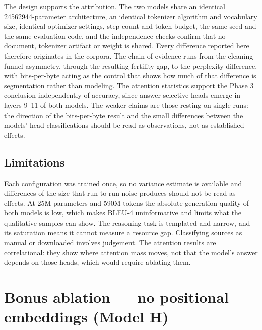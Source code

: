 \documentclass[10pt,a4paper]{article}
\begin{document}
The design supports the attribution. The two models share an identical \num{24562944}-parameter
architecture, an identical tokenizer algorithm and vocabulary size, identical
optimizer settings, step count and token budget, the same seed and the same
evaluation code, and the independence checks confirm that no document, tokenizer
artifact or weight is shared. Every difference reported here therefore originates
in the corpora. The chain of evidence runs from the cleaning-funnel asymmetry,
through the resulting fertility gap, to the perplexity difference, with
bits-per-byte acting as the control that shows how much of that difference is
segmentation rather than modeling. The attention statistics support the Phase 3
conclusion independently of accuracy, since answer-selective heads emerge in
layers 9--11 of both models. The weaker claims are those resting on single runs:
the direction of the bits-per-byte result and the small differences between the
models' head classifications should be read as observations, not as established
effects.

\subsection{Limitations}

Each configuration was trained once, so no variance estimate is available and
differences of the size that run-to-run noise produces should not be read as
effects. At 25M parameters and 590M tokens the absolute generation quality of
both models is low, which makes BLEU-4 uninformative and limits what the
qualitative samples can show. The reasoning task is templated and narrow, and its
saturation means it cannot measure a resource gap. Classifying sources as manual
or downloaded involves judgement. The attention results are correlational: they
show where attention mass moves, not that the model's answer depends on those
heads, which would require ablating them.

\section{Bonus ablation --- no positional embeddings (Model H)}
\end{document}
